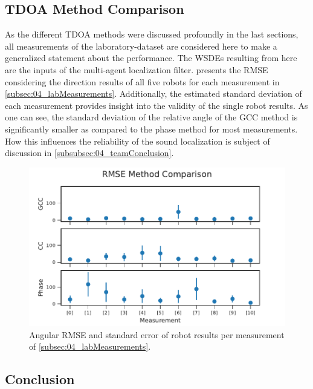 \subsection{\ac{TDOA} Method Comparison}
\label{subsec:04_singleRobotAngleError}

As the different \ac{TDOA} methods were discussed profoundly in the last
sections, all measurements of the laboratory-dataset are considered here
to make a generalized statement about the performance.
The \acp{WSDE} resulting from here are the inputs of the multi-agent
localization filter.
 presents the \ac{RMSE} considering the
direction results of all five robots for each measurement in
\cref{subsec:04_labMeasurements}.
Additionally, the estimated standard deviation of each measurement
provides insight into the validity of the single robot results.
As one can see, the standard deviation of the relative angle of the \ac{GCC}
method is significantly smaller as compared to the phase method for most
measurements.
How this influences the reliability of the sound localization is
subject of discussion in \cref{subsubsec:04_teamConclusion}.
\begin{figure}[h]
	\centering
	\includegraphics[]{figures/evaluation/compare_rmse}
	\caption{Angular RMSE and standard error of robot results per
		measurement of \cref{subsec:04_labMeasurements}.}
	\label{fig:04_compareRmse}
\end{figure}

\subsection{Conclusion}
\label{subsec:04_tdoaConclusion}

